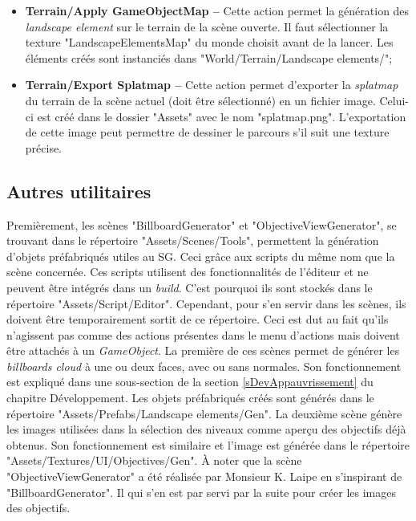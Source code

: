 \begin{itemize}
			\item \textbf{Terrain/Apply GameObjectMap --} Cette action permet la génération des \textit{landscape element} sur le terrain de la scène ouverte. Il faut sélectionner la texture "LandscapeElementsMap" du monde choisit avant de la lancer. Les éléments créés sont instanciés dans "World/Terrain/Landscape elements/";
			
			\item \textbf{Terrain/Export Splatmap --} Cette action permet d'exporter la \textit{splatmap} du terrain de la scène actuel (doit être sélectionné) en un fichier image. Celui-ci est créé dans le dossier "Assets" avec le nom "splatmap.png". L'exportation de cette image peut permettre de dessiner le parcours s'il suit une texture précise.
		\end{itemize}
		
	\subsection*{Autres utilitaires}
		Premièrement, les scènes "BillboardGenerator" et "ObjectiveViewGenerator", se trouvant dans le répertoire "Assets/Scenes/Tools", permettent la génération d'objets préfabriqués utiles au SG. Ceci grâce aux scripts du même nom que la scène concernée. Ces scripts utilisent des fonctionnalités de l'éditeur et ne peuvent être intégrés dans un \textit{build}. C'est pourquoi ils sont stockés dans le répertoire "Assets/Script/Editor". Cependant, pour s'en servir dans les scènes, ils doivent être temporairement sortit de ce répertoire. Ceci est dut au fait qu'ils n'agissent pas comme des actions présentes dans le menu d'actions mais doivent être attachés à un \textit{GameObject}. La première de ces scènes permet de générer les \textit{billboards cloud} à une ou deux faces, avec ou sans normales. Son fonctionnement est expliqué dans une sous-section de la section \ref{sDevAppauvrissement} du chapitre Développement. Les objets préfabriqués créés sont générés dans le répertoire "Assets/Prefabs/Landscape elements/Gen". La deuxième scène génère les images utilisées dans la sélection des niveaux comme aperçu des objectifs déjà obtenus. Son fonctionnement est similaire et l'image est générée dans le répertoire "Assets/Textures/UI/Objectives/Gen". À noter que la scène "ObjectiveViewGenerator" a été réalisée par Monsieur K. Laipe en s'inspirant de "BillboardGenerator". Il qui s'en est par servi par la suite pour créer les images des objectifs.
		\\
		

